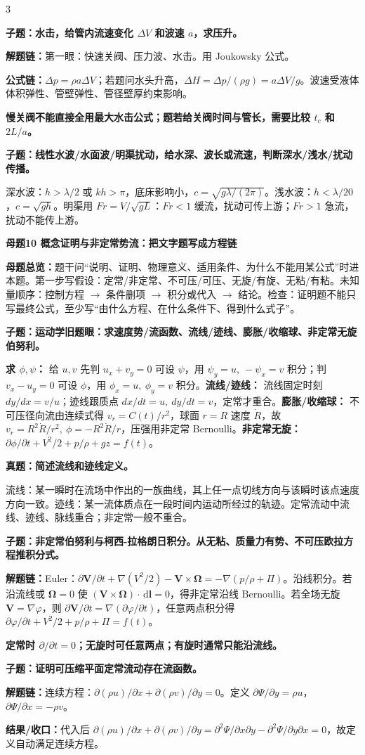 \documentclass[a4paper]{article}
\newcommand{\mt}[1]{\vspace{0.22pt}\colorbox{M}{\parbox{\dimexpr\linewidth-2\fboxsep}{\color{white}\bfseries #1}}\par}
\newcommand{\qt}[1]{\vspace{0.10pt}\colorbox{Q}{\parbox{\dimexpr\linewidth-2\fboxsep}{\color{white}\bfseries #1}}\par}
\newcommand{\ans}[1]{\colorbox{G}{\parbox{\dimexpr\linewidth-2\fboxsep}{#1}}\par}
\newcommand{\warn}[1]{\colorbox{Y}{\parbox{\dimexpr\linewidth-2\fboxsep}{\color{E}\bfseries #1}}\par}
\newcommand{\chain}[1]{{\color{A}\bfseries 解题链：}#1\par}
\newcommand{\res}[1]{{\color{E}\bfseries 结果/收口：}#1\par}
\newcommand{\form}[1]{{\color{M}\bfseries 公式链：}#1\par}
\newcommand{\dd}{\,\mathrm d}
\newcommand{\mview}[1]{\ans{\textbf{母题总览：}#1}}
\begin{document}
\begin{multicols}{3}
\qt{子题：水击，给管内流速变化 $\Delta V$ 和波速 $a$，求压升。}
\chain{第一眼：快速关阀、压力波、水击。用 Joukowsky 公式。}
\form{$\Delta p=\rho a\Delta V$；若题问水头升高，$\Delta H=\Delta p/(\rho g)=a\Delta V/g$。波速受液体体积弹性、管壁弹性、管径壁厚约束影响。}
\warn{慢关阀不能直接全用最大水击公式；题若给关阀时间与管长，需要比较 $t_c$ 和 $2L/a$。}

\qt{子题：线性水波/水面波/明渠扰动，给水深、波长或流速，判断深水/浅水/扰动传播。}
\ans{深水波：$h>\lambda/2$ 或 $kh>\pi$，底床影响小，$c=\sqrt{g\lambda/(2\pi)}$。浅水波：$h<\lambda/20$，$c=\sqrt{gh}$。明渠用 $Fr=V/\sqrt{gL}$：$Fr<1$ 缓流，扰动可传上游；$Fr>1$ 急流，扰动不能传上游。}


\mt{母题10 概念证明与非定常势流：把文字题写成方程链}
\mview{题干问“说明、证明、物理意义、适用条件、为什么不能用某公式”时进本题。第一步写假设：定常/非定常、不可压/可压、无旋/有旋、无粘/有粘。未知量顺序：控制方程 $\to$ 条件删项 $\to$ 积分或代入 $\to$ 结论。检查：证明题不能只写最终公式，至少写“由什么方程、在什么条件下、得到什么式子”。}
\qt{子题：运动学旧题眼：求速度势/流函数、流线/迹线、膨胀/收缩球、非定常无旋伯努利。}
\ans{\textbf{求 $\phi,\psi$：} 给 $u,v$ 先判 $u_x+v_y=0$ 可设 $\psi$，用 $\psi_y=u,\ -\psi_x=v$ 积分；判 $v_x-u_y=0$ 可设 $\phi$，用 $\phi_x=u,\ \phi_y=v$ 积分。\textbf{流线/迹线：} 流线固定时刻 $dy/dx=v/u$；迹线跟质点 $dx/dt=u,\ dy/dt=v$，定常才重合。\textbf{膨胀/收缩球：} 不可压径向流由连续式得 $v_r=C(t)/r^2$，球面 $r=R$ 速度 $\dot R$，故 $v_r=R^2\dot R/r^2,\ \phi=-R^2\dot R/r$，压强用非定常 Bernoulli。\textbf{非定常无旋：} $\partial\phi/\partial t+V^2/2+p/\rho+gz=f(t)$。}
\qt{真题：简述流线和迹线定义。}
\ans{流线：某一瞬时在流场中作出的一族曲线，其上任一点切线方向与该瞬时该点速度方向一致。迹线：某一流体质点在一段时间内运动所经过的轨迹。定常流动中流线、迹线、脉线重合；非定常一般不重合。}

\qt{子题：非定常伯努利与柯西-拉格朗日积分。从无粘、质量力有势、不可压欧拉方程推积分式。}
\chain{Euler：$\partial\bm V/\partial t+\nabla(V^2/2)-\bm V\times\bm\Omega=-\nabla(p/\rho+\Pi)$。沿线积分。若沿流线或 $\bm\Omega=0$ 使 $(\bm V\times\bm\Omega)\cdot\dd\bm l=0$，得非定常沿线 Bernoulli。若全场无旋 $\bm V=\nabla\varphi$，则 $\partial\bm V/\partial t=\nabla(\partial\varphi/\partial t)$，任意两点积分得 $\partial\varphi/\partial t+V^2/2+p/\rho+\Pi=f(t)$。}
\warn{定常时 $\partial/\partial t=0$；无旋时可任意两点；有旋时通常只能沿流线。}

\qt{子题：证明可压缩平面定常流动存在流函数。}
\chain{连续方程：$\partial(\rho u)/\partial x+\partial(\rho v)/\partial y=0$。定义 $\partial\Psi/\partial y=\rho u$，$\partial\Psi/\partial x=-\rho v$。}
\res{代入后 $\partial(\rho u)/\partial x+\partial(\rho v)/\partial y=\partial^2\Psi/\partial x\partial y-\partial^2\Psi/\partial y\partial x=0$，故定义自动满足连续方程。}


\end{multicols}
\end{document}
